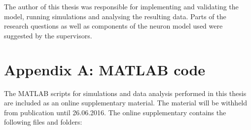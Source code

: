 \documentclass[a4paper,12pt]{report}
\theoremstyle{definition}
\begin{document}
The author of this thesis was responsible for implementing and validating the model, running simulations and analysing the resulting data. Parts of the research questions as well as components of the neuron model used were suggested by the supervisors.




\newpage






\chapter*{Appendix A: MATLAB code}
\label{appendix:code}

The MATLAB scripts for simulations and data analysis performed in this thesis are included as an online supplementary material. The material will be withheld from publication until 26.06.2016. The online supplementary contains the following files and folders:
\end{document}
